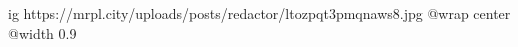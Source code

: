  
 
 
 
 

\ifcmt
  ig https://mrpl.city/uploads/posts/redactor/ltozpqt3pmqnaws8.jpg
  @wrap center
  @width 0.9
\fi
